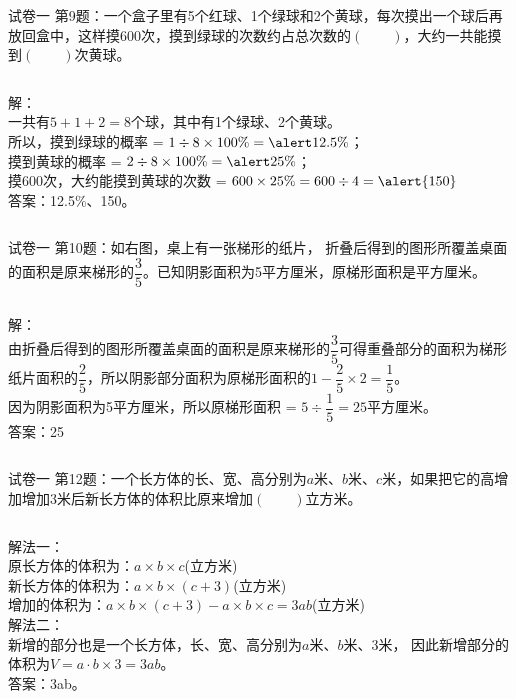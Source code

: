 \documentclass[aspectratio=169]{ctexbeamer} %
\begin{document}
\begin{frame}[t]{试卷一}
第9题：一个盒子里有5个红球、1个绿球和2个黄球，每次摸出一个球后再放回盒中，这样摸600次，摸到绿球的次数约占总次数的$(\qquad)$，大约一共能摸到$(\qquad)$次黄球。
\pause
\begin{columns}
解：\\
一共有$5 + 1 + 2 = 8$个球，其中有1个绿球、2个黄球。\\
所以，摸到绿球的概率 = $1 \div 8 \times 100\% = \alert{12.5\%}$；\\
\pause
摸到黄球的概率 = $2 \div 8 \times 100\% = \alert{25\%}$；\\
摸600次，大约能摸到黄球的次数  = $600 \times 25\% = 600 \div 4 = \alert{150}$ \\
答案：\alert{12.5\%}、\alert{150}。
\end{columns}
\end{frame}

\begin{frame}[t]{试卷一}
第10题：如右图，桌上有一张梯形的纸片， 折叠后得到的图形所覆盖桌面的面积是原来梯形的$\dfrac{3}{5}$。已知阴影面积为5平方厘米，原梯形面积是平方厘米。
\vspace{1em}
\pause
\begin{columns}
解：\\
由折叠后得到的图形所覆盖桌面的面积是原来梯形的$\dfrac{3}{5}$可得重叠部分的面积为梯形纸片面积的$\dfrac{2}{5}$，所以阴影部分面积为原梯形面积的$1 - \dfrac{2}{5} \times 2 = \dfrac{1}{5}$。\\
因为阴影面积为5平方厘米，所以原梯形面积 = $5 \div \dfrac{1}{5} = 25$平方厘米。\\
答案：\alert{25}
\end{columns}

\end{frame}

\begin{frame}[t]{试卷一}
第12题：一个长方体的长、宽、高分别为$a$米、$b$米、$c$米，如果把它的高增加增加3米后新长方体的体积比原来增加$(\qquad)$立方米。
\pause
\vspace{1em}
\begin{columns}
解法一：\\
原长方体的体积为：$a \times b \times c$(立方米) \\
新长方体的体积为：$a \times b \times (c+3)$(立方米) \\
增加的体积为：$a \times b \times (c+3) - a \times b \times c = 3ab$(立方米) \\
\pause
\vspace{1em}
解法二：\\
新增的部分也是一个长方体，长、宽、高分别为$a$米、$b$米、$3$米，
因此新增部分的体积为$V = a \cdot b \times 3 = 3ab$。\\
答案：\alert{3ab}。\\
\end{columns}
\end{frame}
\end{document}

